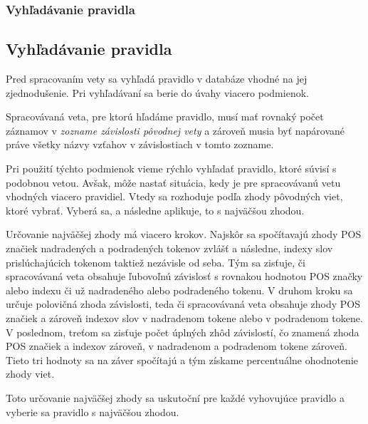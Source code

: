 %
%
{
	\subsubsection{Vyhľadávanie pravidla}
}
{
	\subsection{Vyhľadávanie pravidla}
}
\label{subsubsection:rule_lookup}
Pred spracovaním vety sa vyhľadá pravidlo v databáze vhodné na jej zjednodušenie. Pri vyhľadávaní sa berie do úvahy viacero podmienok.

Spracovávaná veta, pre ktorú hľadáme pravidlo, musí mať rovnaký počet záznamov v \textit{zozname závislosti pôvodnej vety} a zároveň musia byť napárované práve všetky názvy vzťahov v závislostiach v tomto zozname.

Pri použití týchto podmienok vieme rýchlo vyhľadať pravidlo, ktoré súvisí s podobnou vetou. Avšak, môže nastať situácia, kedy je pre spracovávanú vetu vhodných viacero pravidiel. Vtedy sa rozhoduje podľa zhody pôvodných viet, ktoré vybrať. Vyberá sa, a následne aplikuje, to s najväčšou zhodou.

Určovanie najväčšej zhody má viacero krokov. Najskôr sa spočítavajú zhody POS značiek nadradených a podradených tokenov zvlášť a následne, indexy slov prislúchajúcich tokenom taktiež nezávisle od seba. Tým sa zisťuje, či spracovávaná veta obsahuje ľubovoľnú závislosť s rovnakou hodnotou POS značky alebo indexu či už nadradeného alebo podradeného tokenu. V druhom kroku sa určuje polovičná zhoda závislosti, teda či spracovávaná veta obsahuje zhody POS značiek a zároveň indexov slov v nadradenom tokene alebo v podradenom tokene. V poslednom, treťom sa zisťuje počet úplných zhôd závislostí, čo znamená zhoda POS značiek a indexov zároveň, v nadradenom a podradenom tokene zároveň. Tieto tri hodnoty sa na záver spočítajú a tým získame percentuálne ohodnotenie zhody viet.

Toto určovanie najväčšej zhody sa uskutoční pre každé vyhovujúce pravidlo a vyberie sa pravidlo s najväčšou zhodou. \\

